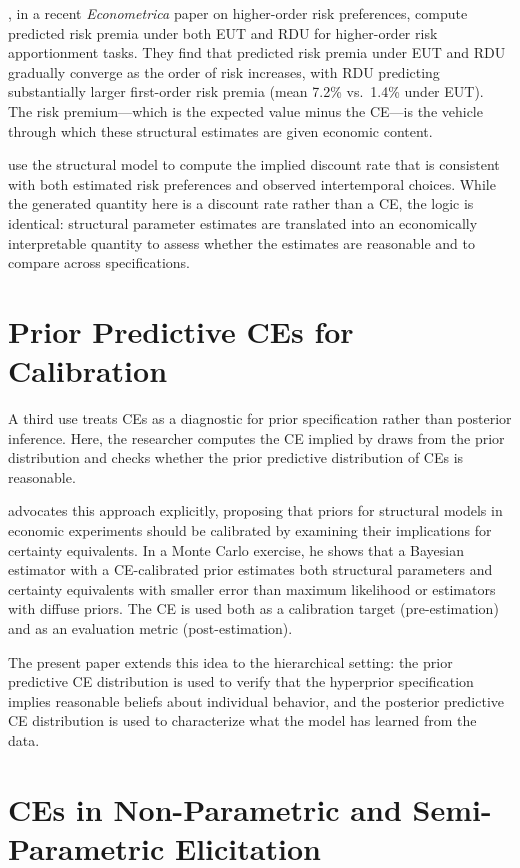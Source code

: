 \documentclass[12pt,a4paper]{article}
\begin{document}
\textcite{LauYoo2025}, in a recent \textit{Econometrica} paper on higher-order
risk preferences, compute predicted risk premia under both EUT and RDU for
higher-order risk apportionment tasks. They find that predicted risk premia
under EUT and RDU gradually converge as the order of risk increases, with RDU
predicting substantially larger first-order risk premia (mean 7.2\% vs.\ 1.4\%
under EUT). The risk premium---which is the expected value minus the CE---is
the vehicle through which these structural estimates are given economic content.

\textcite{Andersen2008} use the structural model to compute the implied
discount rate that is consistent with both estimated risk preferences and
observed intertemporal choices. While the generated quantity here is a discount
rate rather than a CE, the logic is identical: structural parameter estimates
are translated into an economically interpretable quantity to assess whether
the estimates are reasonable and to compare across specifications.

\section{Prior Predictive CEs for Calibration}

A third use treats CEs as a diagnostic for prior specification rather than
posterior inference. Here, the researcher computes the CE implied by draws from
the prior distribution and checks whether the prior predictive distribution of
CEs is reasonable.

\textcite{Bland2025} advocates this approach explicitly, proposing that priors
for structural models in economic experiments should be calibrated by examining
their implications for certainty equivalents. In a Monte Carlo exercise, he
shows that a Bayesian estimator with a CE-calibrated prior estimates both
structural parameters and certainty equivalents with smaller error than maximum
likelihood or estimators with diffuse priors. The CE is used both as a
calibration target (pre-estimation) and as an evaluation metric
(post-estimation).

The present paper extends this idea to the hierarchical setting: the prior
predictive CE distribution is used to verify that the hyperprior specification
implies reasonable beliefs about individual behavior, and the posterior
predictive CE distribution is used to characterize what the model has learned
from the data.

\section{CEs in Non-Parametric and Semi-Parametric Elicitation}
\end{document}
